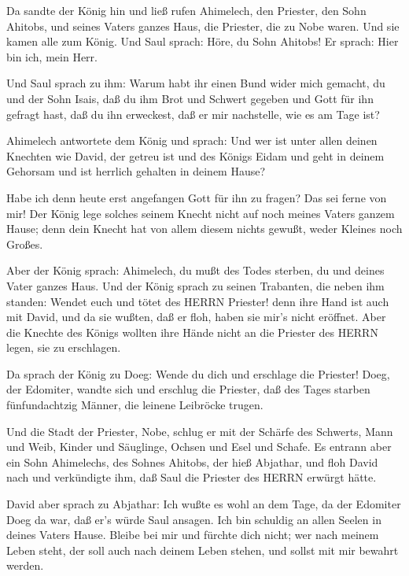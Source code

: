  Da sandte der König hin und ließ rufen Ahimelech, den
Priester, den Sohn Ahitobs, und seines Vaters ganzes Haus, die Priester,
die zu Nobe waren. Und sie kamen alle zum König.  Und Saul
sprach: Höre, du Sohn Ahitobs! Er sprach: Hier bin ich, mein Herr.

 Und Saul sprach zu ihm: Warum habt ihr einen Bund wider
mich gemacht, du und der Sohn Isais, daß du ihm Brot und Schwert gegeben
und Gott für ihn gefragt hast, daß du ihn erweckest, daß er mir
nachstelle, wie es am Tage ist?

 Ahimelech antwortete dem König und sprach: Und wer ist
unter allen deinen Knechten wie David, der getreu ist und des Königs
Eidam und geht in deinem Gehorsam und ist herrlich gehalten in deinem
Hause?

 Habe ich denn heute erst angefangen Gott für ihn zu
fragen? Das sei ferne von mir! Der König lege solches seinem Knecht
nicht auf noch meines Vaters ganzem Hause; denn dein Knecht hat von
allem diesem nichts gewußt, weder Kleines noch Großes.

 Aber der König sprach: Ahimelech, du mußt des Todes
sterben, du und deines Vater ganzes Haus.  Und der König
sprach zu seinen Trabanten, die neben ihm standen: Wendet euch und tötet
des HERRN Priester! denn ihre Hand ist auch mit David, und da sie
wußten, daß er floh, haben sie mir's nicht eröffnet. Aber die Knechte
des Königs wollten ihre Hände nicht an die Priester des HERRN legen, sie
zu erschlagen.

 Da sprach der König zu Doeg: Wende du dich und erschlage
die Priester! Doeg, der Edomiter, wandte sich und erschlug die Priester,
daß des Tages starben fünfundachtzig Männer, die leinene Leibröcke
trugen.

 Und die Stadt der Priester, Nobe, schlug er mit der
Schärfe des Schwerts, Mann und Weib, Kinder und Säuglinge, Ochsen und
Esel und Schafe.  Es entrann aber ein Sohn Ahimelechs, des
Sohnes Ahitobs, der hieß Abjathar, und floh David nach  und
verkündigte ihm, daß Saul die Priester des HERRN erwürgt hätte.

 David aber sprach zu Abjathar: Ich wußte es wohl an dem
Tage, da der Edomiter Doeg da war, daß er's würde Saul ansagen. Ich bin
schuldig an allen Seelen in deines Vaters Hause.  Bleibe
bei mir und fürchte dich nicht; wer nach meinem Leben steht, der soll
auch nach deinem Leben stehen, und sollst mit mir bewahrt werden.

